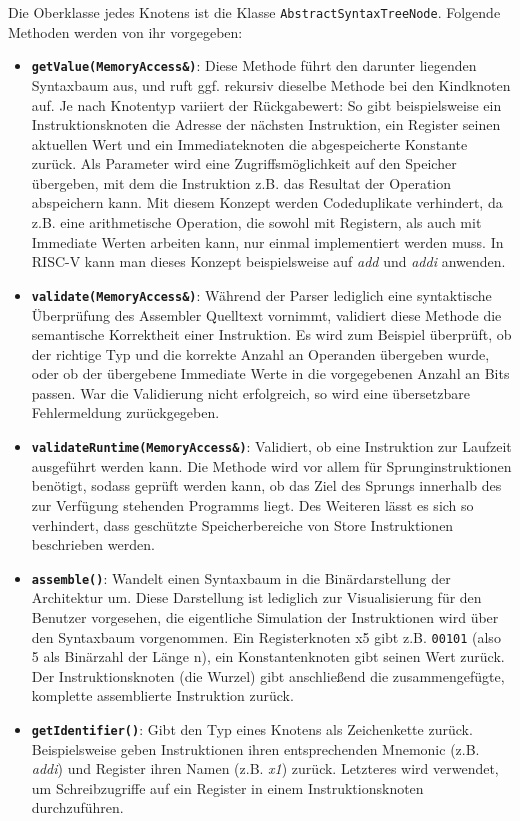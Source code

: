 Die Oberklasse jedes Knotens ist die Klasse \texttt{AbstractSyntaxTreeNode}.
Folgende Methoden werden von ihr vorgegeben:

\begin{itemize}
	\label{dev-manual-arch-node-functions}
	\item \textbf{\texttt{getValue(MemoryAccess\&)}}: Diese Methode führt den
	darunter liegenden Syntaxbaum aus, und ruft ggf. rekursiv dieselbe Methode
	bei den Kindknoten auf. Je nach Knotentyp variiert der Rückgabewert: So gibt
	beispielsweise ein Instruktionsknoten die Adresse der nächsten Instruktion,
	ein Register seinen aktuellen Wert und ein Immediateknoten die
	abgespeicherte Konstante zurück. Als Parameter wird eine Zugriffsmöglichkeit auf den
	Speicher übergeben, mit dem die Instruktion z.B. das Resultat der Operation
	abspeichern kann.
	Mit diesem Konzept werden Codeduplikate verhindert, da z.B. eine arithmetische
	Operation, die sowohl mit Registern, als auch mit Immediate Werten arbeiten
	kann, nur einmal implementiert werden muss. In RISC-V kann man dieses Konzept
	beispielsweise auf \emph{add} und \emph{addi} anwenden.

	\item \textbf{\texttt{validate(MemoryAccess\&)}}: Während der Parser lediglich
	eine syntaktische Überprüfung des Assembler Quelltext vornimmt, validiert
	diese Methode die semantische Korrektheit einer Instruktion. Es wird zum
	Beispiel überprüft, ob der richtige Typ und die korrekte Anzahl an Operanden
	übergeben wurde, oder ob der übergebene Immediate Werte in die vorgegebenen
	Anzahl an Bits passen. War die Validierung nicht erfolgreich, so wird eine
	übersetzbare Fehlermeldung zurückgegeben.

	\item \textbf{\texttt{validateRuntime(MemoryAccess\&)}}: Validiert, ob eine
	Instruktion zur Laufzeit ausgeführt werden kann. Die Methode wird vor allem
	für Sprunginstruktionen benötigt, sodass geprüft werden kann, ob das Ziel
	des Sprungs innerhalb des zur Verfügung stehenden Programms liegt. Des
	Weiteren lässt es sich so verhindert, dass geschützte Speicherbereiche
	von Store Instruktionen beschrieben werden.

	\item \textbf{\texttt{assemble()}}: Wandelt einen Syntaxbaum in die
	Binärdarstellung der Architektur um. Diese Darstellung ist lediglich zur
	Visualisierung für den Benutzer vorgesehen, die eigentliche Simulation der
	Instruktionen wird über den Syntaxbaum vorgenommen. Ein Registerknoten x5
	gibt z.B. \texttt{00101} (also 5 als Binärzahl der Länge n), ein Konstantenknoten gibt seinen Wert
	zurück. Der Instruktionsknoten (die Wurzel) gibt anschließend die
	zusammengefügte, komplette assemblierte Instruktion zurück.

	\item \textbf{\texttt{getIdentifier()}}: Gibt den Typ eines Knotens als
	Zeichenkette zurück. Beispielsweise geben Instruktionen ihren entsprechenden
	Mnemonic (z.B. \emph{addi}) und Register ihren Namen (z.B. \emph{x1})
	zurück. Letzteres wird verwendet, um Schreibzugriffe auf ein Register
	in einem Instruktionsknoten durchzuführen.
\end{itemize}

